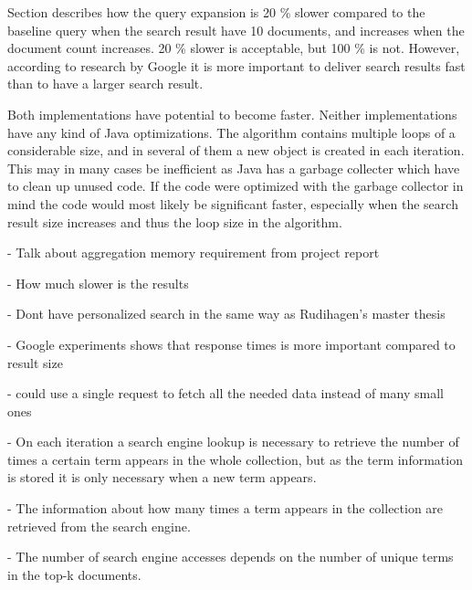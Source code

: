 Section describes how the query expansion is 20 \% slower compared to the baseline query when the search result have 10 documents,
and increases when the document count increases.
20 \% slower is acceptable,
but 100 \% is not.
However,
according to research by Google \cite{google-latency} it is more important to deliver search results fast than to have a larger search result.

Both implementations have potential to become faster.
Neither implementations have any kind of Java optimizations.
The algorithm contains multiple loops of a considerable size,
and in several of them a new object is created in each iteration.
This may in many cases be inefficient as Java has a garbage collecter which have to clean up unused code.
If the code were optimized with the garbage collector in mind the code would most likely be significant faster,
especially when the search result size increases and thus the loop size in the algorithm.

- Talk about aggregation memory requirement from project report

- How much slower is the results

- Dont have personalized search in the same way as Rudihagen's master thesis

- Google experiments shows that response times is more important compared to result size

- could use a single request to fetch all the needed data instead of many small ones

- On each iteration a search engine lookup is necessary to retrieve the number of times a certain term appears in the whole collection,
but as the term information is stored it is only necessary when a new term appears.

- The information about how many times a term appears in the collection are retrieved from the search engine.

- The number of search engine accesses depends on the number of unique terms in the top-k documents.
